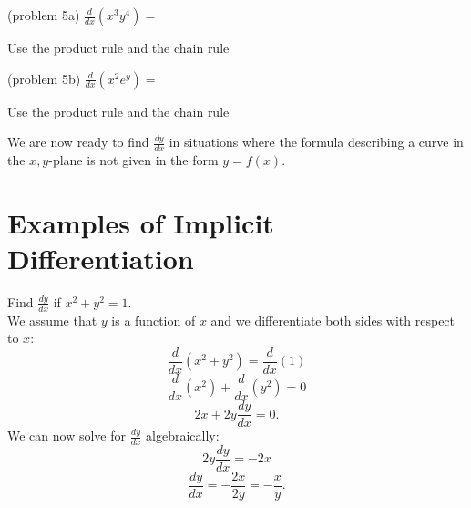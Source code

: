 \documentclass[handout]{ximera}
\begin{document}
\begin{center}
\begin{foldable}
\end{foldable}
\end{center}

\begin{problem}(problem 5a)
  $\displaystyle{\frac{d}{dx} \left(x^3y^4\right)=}$
 
\begin{multipleChoice}
\end{multipleChoice}
	     
		\begin{hint}
      Use the product rule and the chain rule
    \end{hint}
 	
\end{problem}


\begin{problem}(problem 5b)
  $\displaystyle{\frac{d}{dx} \left(x^2e^y\right)=}$
 
\begin{multipleChoice}
\end{multipleChoice}
	     
		\begin{hint}
      Use the product rule and the chain rule
    \end{hint}
 	
\end{problem}






We are now ready to find $\frac{dy}{dx}$ in situations where the formula describing a curve in the $x,y$-plane 
is not given in the form $y = f(x)$.

\section{Examples of Implicit Differentiation}


\begin{example}[example 6]
Find $\displaystyle{\frac{dy}{dx}}$ if $x^2 + y^2 = 1$.\\
We assume that $y$ is a 
function of $x$ and we differentiate both 
sides with respect to $x$:
\[\frac{d}{dx}(x^2 + y^2)  = \frac{d}{dx} (1) \]
\[\frac{d}{dx}(x^2) + \frac{d}{dx} (y^2) = 0\]
\[2x + 2y\frac{dy}{dx} = 0.\]
We can now solve for $\displaystyle{\frac{dy}{dx}}$ algebraically:
\[2y\frac{dy}{dx} = -2x\]
\[\frac{dy}{dx} = -\frac{2x}{2y}= -\frac{x}{y}.\]
\end{example}
\end{document}
